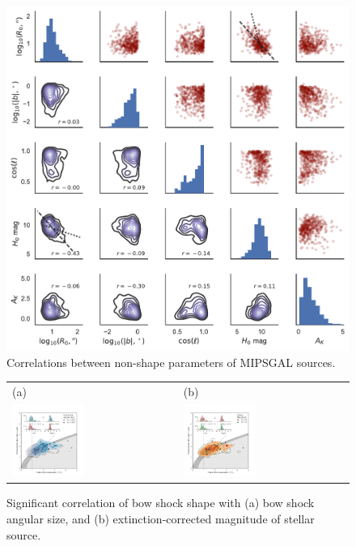 \begin{figure}
  \centering
  \includegraphics[width=\textwidth]{figs/mipsgal-pairplot}
  \caption[]{Correlations between non-shape parameters of MIPSGAL sources.}
  \label{fig:mipsgal-pairplot}
\end{figure}

\begin{figure}
  \centering
  \begin{tabular}{ll}
    (a) & (b) \\
    \includegraphics[width=0.45\textwidth]{figs/mipsgal-Rc-R90-R0} &
    \includegraphics[width=0.45\textwidth]{figs/mipsgal-Rc-R90-Mag} 
  \end{tabular}
  \caption[]{Significant correlation of bow shock shape with (a) bow
    shock angular size, and (b) extinction-corrected magnitude of
    stellar source.}
  \label{fig:mipsgal-correlated}
\end{figure}

